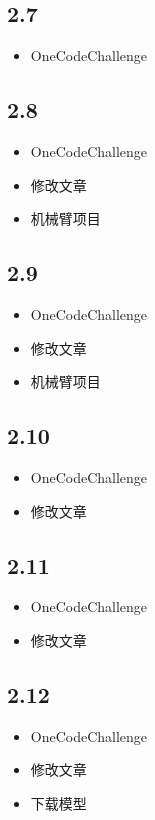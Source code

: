 \documentclass[UTF8]{ctexart}
\begin{document}
\subsection*{2.7}
\begin{itemize}
    \item OneCodeChallenge
\end{itemize}

\subsection*{2.8}
\begin{itemize}
    \item OneCodeChallenge
    \item 修改文章
    \item 机械臂项目
\end{itemize}

\subsection*{2.9}
\begin{itemize}
    \item OneCodeChallenge
    \item 修改文章
    \item 机械臂项目
\end{itemize}

\subsection*{2.10}
\begin{itemize}
    \item OneCodeChallenge
    \item 修改文章
\end{itemize}

\subsection*{2.11}
\begin{itemize}
    \item OneCodeChallenge
    \item 修改文章
\end{itemize}

\subsection*{2.12}
\begin{itemize}
    \item OneCodeChallenge
    \item 修改文章
    \item 下载模型
\end{itemize}
\end{document}
